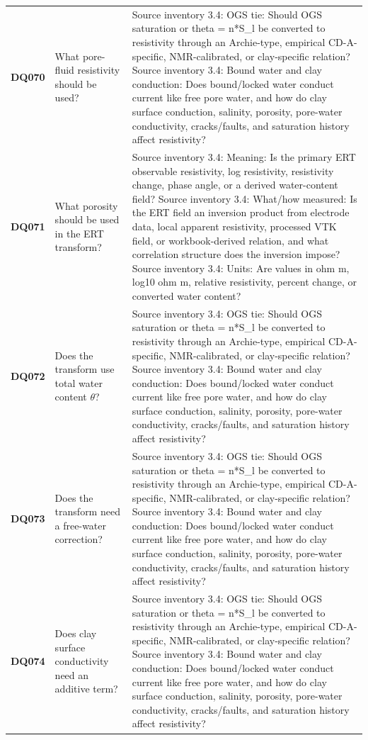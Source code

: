 \begin{longtable}{@{}L{0.09\textwidth} L{0.31\textwidth} L{0.52\textwidth}@{}}
\addlinespace[0.18em]
\textbf{DQ070} & What pore-fluid resistivity should be used? & Source inventory 3.4: OGS tie: Should OGS saturation or theta = n*S\_l be converted to resistivity through an Archie-type, empirical CD-A-specific, NMR-calibrated, or clay-specific relation? Source inventory 3.4: Bound water and clay conduction: Does bound/locked water conduct current like free pore water, and how do clay surface conduction, salinity, porosity, pore-water conductivity, cracks/faults, and saturation history affect resistivity?\\
\addlinespace[0.18em]
\textbf{DQ071} & What porosity should be used in the ERT transform? & Source inventory 3.4: Meaning: Is the primary ERT observable resistivity, log resistivity, resistivity change, phase angle, or a derived water-content field? Source inventory 3.4: What/how measured: Is the ERT field an inversion product from electrode data, local apparent resistivity, processed VTK field, or workbook-derived relation, and what correlation structure does the inversion impose? Source inventory 3.4: Units: Are values in ohm m, log10 ohm m, relative resistivity, percent change, or converted water content?\\
\addlinespace[0.18em]
\textbf{DQ072} & Does the transform use total water content \(\theta\)? & Source inventory 3.4: OGS tie: Should OGS saturation or theta = n*S\_l be converted to resistivity through an Archie-type, empirical CD-A-specific, NMR-calibrated, or clay-specific relation? Source inventory 3.4: Bound water and clay conduction: Does bound/locked water conduct current like free pore water, and how do clay surface conduction, salinity, porosity, pore-water conductivity, cracks/faults, and saturation history affect resistivity?\\
\addlinespace[0.18em]
\textbf{DQ073} & Does the transform need a free-water correction? & Source inventory 3.4: OGS tie: Should OGS saturation or theta = n*S\_l be converted to resistivity through an Archie-type, empirical CD-A-specific, NMR-calibrated, or clay-specific relation? Source inventory 3.4: Bound water and clay conduction: Does bound/locked water conduct current like free pore water, and how do clay surface conduction, salinity, porosity, pore-water conductivity, cracks/faults, and saturation history affect resistivity?\\
\addlinespace[0.18em]
\textbf{DQ074} & Does clay surface conductivity need an additive term? & Source inventory 3.4: OGS tie: Should OGS saturation or theta = n*S\_l be converted to resistivity through an Archie-type, empirical CD-A-specific, NMR-calibrated, or clay-specific relation? Source inventory 3.4: Bound water and clay conduction: Does bound/locked water conduct current like free pore water, and how do clay surface conduction, salinity, porosity, pore-water conductivity, cracks/faults, and saturation history affect resistivity?\\

\end{longtable}
